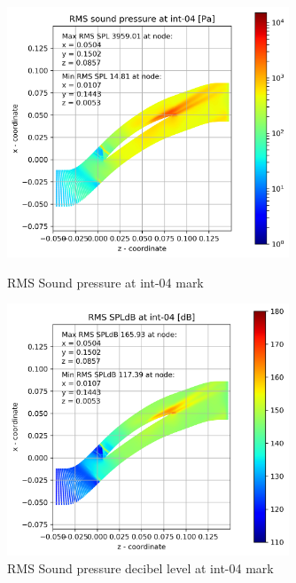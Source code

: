 \begin{figure}[ht]
  \centering
  \includegraphics[width=0.75\textwidth]{Figures/int-04-rms-spl.png}
  \caption{RMS Sound pressure at int-04 mark} \label{int-04-rms-spl}
  
  \vspace*{\floatsep}%

  \includegraphics[width=0.75\textwidth]{Figures/int-04-rms-spldb.png}
  \caption{RMS Sound pressure decibel level at int-04 mark} \label{int-04-rms-spldb}
\end{figure}
